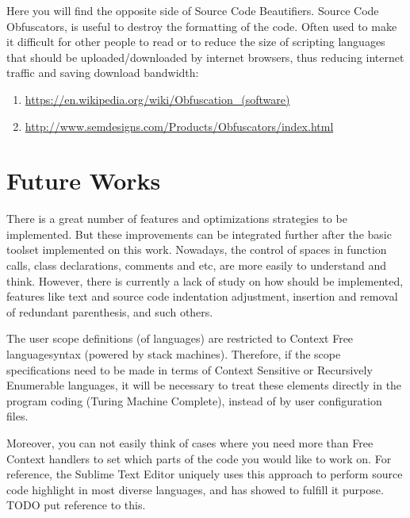 Here you will find the opposite side of Source Code Beautifiers.
Source Code Obfuscators,
is useful to destroy the formatting of the code.
Often used to make it difficult for other people to read or to reduce the size of scripting languages that should be
uploaded/downloaded by internet browsers,
thus reducing internet traffic and saving download bandwidth:

\begin{sloppypar}
\begin{bluebox}\RaggedRight
\begin{enumerate}[leftmargin=*,parsep=0pt]

\item \url{https://en.wikipedia.org/wiki/Obfuscation_(software)}

\item \url{http://www.semdesigns.com/Products/Obfuscators/index.html}

\end{enumerate}
\end{bluebox}
\end{sloppypar}


\section{Future Works}

There is a great number of features and optimizations strategies to be implemented.
But these improvements can be integrated further after the basic toolset implemented on this work.
Nowadays,
the control of spaces in function calls,
class declarations, comments and etc,
are more easily to understand and think.
However,
there is currently a lack of study on how should be implemented,
features like text and source code indentation adjustment,
insertion and removal of redundant parenthesis, and such others.

The user scope definitions (of languages) are restricted to Context Free language\s syntax (powered by stack machines).
Therefore,
if the scope specifications need to be made in terms of Context Sensitive or Recursively Enumerable languages,
it will be necessary to treat these elements directly in the program coding (Turing Machine Complete),
instead of by user configuration files.

Moreover,
you can not easily think of cases where you need more than Free Context handlers to set which parts of the code you
would like to work on.
For reference,
the Sublime Text Editor uniquely uses this approach to perform source code highlight in most diverse languages,
and has showed to fulfill it purpose.
TODO put reference to this.

